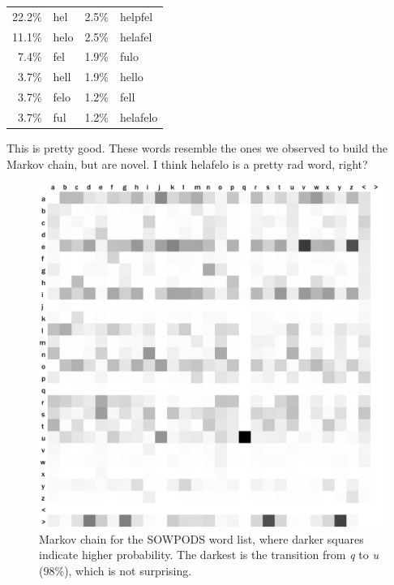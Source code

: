 \documentclass[twocolumn]{article}
\begin{document}
\begin{center}
\begin{tabular}{rl@{\quad\quad}rl}
22.2\%  &  hel      &      2.5\%  &  helpfel  \\
11.1\%  &  helo     &      2.5\%  &  helafel  \\
 7.4\%  &  fel      &      1.9\%  &  fulo     \\
 3.7\%  &  hell     &      1.9\%  &  hello    \\
 3.7\%  &  felo     &      1.2\%  &  fell     \\
 3.7\%  &  ful      &      1.2\%  &  helafelo \\
\end{tabular}
\end{center}

This is pretty good. These words resemble the ones we observed to build
the Markov chain, but are novel. I think helafelo is a pretty rad word,
right?

\begin{figure}
\includegraphics[width=\linewidth]{coin1}
\caption{Markov chain for the SOWPODS word list, where darker squares
indicate higher probability. The darkest is the transition from {\it q}
to {\it u} ($98\%$), which is not surprising.}
\label{fig:sowpodsbigrams}
\end{figure}
\end{document}
